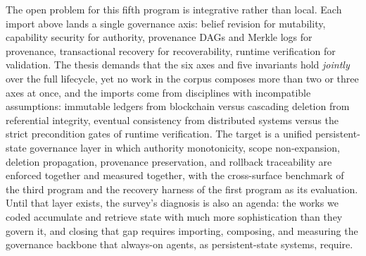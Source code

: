 The open problem for this fifth program is integrative rather than local. Each import
above lands a single governance axis: belief revision for mutability, capability
security for authority, provenance DAGs and Merkle logs for provenance,
transactional recovery for recoverability, runtime verification for validation. The
thesis demands that the six axes and five invariants hold \emph{jointly} over the
full lifecycle, yet no work in the corpus composes more than two or three axes at
once, and the imports come from disciplines with incompatible assumptions: immutable
ledgers from blockchain versus cascading deletion from referential integrity,
eventual consistency from distributed systems versus the strict precondition gates of
runtime verification. The target is a unified persistent-state governance layer in
which authority monotonicity, scope non-expansion, deletion propagation, provenance
preservation, and rollback traceability are enforced together and measured together,
with the cross-surface benchmark of the third program and the recovery harness of the
first program as its evaluation. Until that layer exists, the survey's diagnosis is
also an agenda: the works we coded accumulate and retrieve state with much more
sophistication than they govern it, and closing that gap requires importing,
composing, and measuring the governance backbone that always-on agents, as
persistent-state systems, require.
